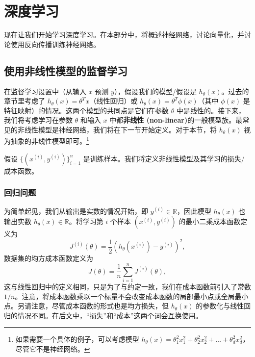 \chapter{深度学习}\label{chapter:7}
现在让我们开始学习深度学习。在本部分中，将概述神经网络，讨论向量化，并讨论使用反向传播训练神经网络。

\section{使用非线性模型的监督学习}\label{sec:7.1}

在监督学习设置中（从输入 $x$ 预测 $y$），假设我们的模型/假设是 $h_\theta(x)$。过去的章节里考虑了 $h_\theta(x) = \theta^T x$（线性回归）或 $h_\theta(x) = \theta^T \phi(x)$（其中 $\phi(x)$ 是特征映射）的情况。这两个模型的共同点是它们在参数 $\theta$ 中是线性的。接下来，我们将考虑学习在参数 $\theta$ 和输入 $x$ 中都\textbf{非线性 (non-linear)}的一般模型族。最常见的非线性模型是神经网络，我们将在下一节开始定义。对于本节，将 $h_\theta(x)$ 视为抽象的非线性模型即可。\footnote{如果需要一个具体的例子，可以考虑模型 $h_\theta(x) = \theta_1^2 x_1^2 + \theta_2^2 x_2^2 + \dots + \theta_d^2 x_d^2$，尽管它不是神经网络。}

假设 $\{(x^{(i)}, y^{(i)})\}_{i=1}^n$ 是训练样本。我们将定义非线性模型及其学习的损失/成本函数。

\subsection*{回归问题}

为简单起见，我们从输出是实数的情况开始，即 $y^{(i)} \in \mathbb{R}$，因此模型 $h_\theta(x)$ 也输出实数 $h_\theta(x) \in \mathbb{R}$。将学习第 $i$ 个样本 $(x^{(i)}, y^{(i)})$ 的最小二乘成本函数定义为
\begin{equation} \label{eq:7.1}
    J^{(i)}(\theta) = \frac{1}{2} (h_\theta(x^{(i)}) - y^{(i)})^2,
\end{equation}
数据集的均方成本函数定义为
\begin{equation} \label{eq:7.2}
    J(\theta) = \frac{1}{n} \sum_{i=1}^n J^{(i)}(\theta),
\end{equation}
这与线性回归中的定义相同，只是为了与约定一致，我们在成本函数前引入了常数 $1/n$。注意，将成本函数乘以一个标量不会改变成本函数的局部最小点或全局最小点。另请注意，尽管成本函数的形式也是均方损失，但 $h_\theta(x)$ 的参数化与线性回归的情况不同。在后文中，“损失”和“成本”这两个词会互换使用。

